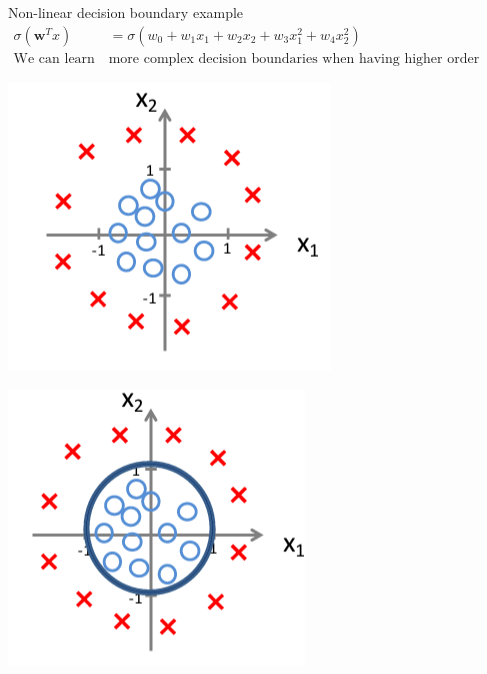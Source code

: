 \documentclass[serif, aspectratio=169]{beamer}
\begin{document}
    \begin{frame}{Non-linear decision boundary example}
        \begin{align*}
            \sigma (\mathbf{w}^Tx) &= \sigma (w_0 + w_1 x_1 + w_2 x_2 + w_3x_1^2 + w_4x_2^2) \\
            \text{We can learn } & \text{more complex decision boundaries when having higher order terms}
        \end{align*}

        \begin{minipage}{0.30\linewidth}
            \centering
            \includegraphics[width=\linewidth]{pic/lrDB3.png}
        \end{minipage}
        \hfill
        \begin{minipage}{0.30\linewidth}
            \centering
            \includegraphics[width=\linewidth]{pic/lrDB4.png}
        \end{minipage}


\end{frame}
\end{document}
